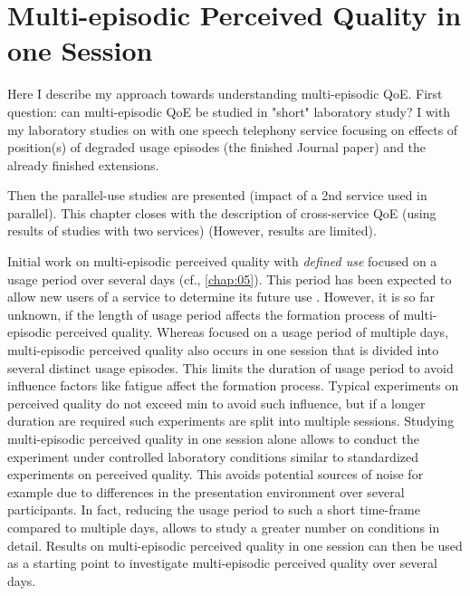 \chapter{Multi-episodic Perceived Quality in one Session}\label{chap:06}
\begin{chapter-abstract}
Here I describe my approach towards understanding multi-episodic QoE.
First question: can multi-episodic QoE be studied in "short" laboratory study?
I with my laboratory studies on with one speech telephony service focusing on effects of position(s) of degraded usage episodes (the finished Journal paper) and the already finished extensions.

Then the parallel-use studies are presented (impact of a 2nd service used in parallel).
This chapter closes with the description of cross-service QoE (using results of studies with two services) (However, results are limited).
\end{chapter-abstract}

Initial work on multi-episodic perceived quality with \emph{defined use} focused on a usage period over several days (cf., \autoref{chap:05}). 
This period has been expected to allow new users of a service to determine its future use \citep[cf.,][]{moller_single-call_2011}.
However, it is so far unknown, if the length of usage period affects the formation process of multi-episodic perceived quality.
Whereas \cite{moller_single-call_2011} focused on a usage period of multiple days, multi-episodic perceived quality also occurs in one session that is divided into several distinct usage episodes.
This limits the duration of usage period to avoid influence factors like fatigue affect the formation process.
Typical experiments on perceived quality do not exceed \unit[90]{min} to avoid such influence, but if a longer duration are required such experiments are split into multiple sessions.
Studying multi-episodic perceived quality in one session alone allows to conduct the experiment under controlled laboratory conditions similar to standardized experiments on perceived quality.
This avoids potential sources of noise for example due to differences in the presentation environment over several participants.
In fact, reducing the usage period to such a short time-frame compared to multiple days, allows to study a greater number on conditions in detail.
Results on multi-episodic perceived quality in one session can then be used as a starting point to investigate multi-episodic perceived quality over several days.

